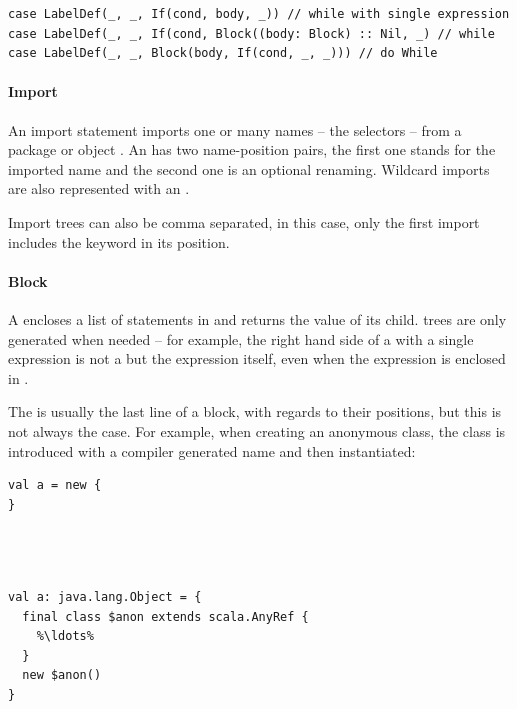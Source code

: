 \begin{lstlisting}
case LabelDef(_, _, If(cond, body, _)) // while with single expression
case LabelDef(_, _, If(cond, Block((body: Block) :: Nil, _) // while
case LabelDef(_, _, Block(body, If(cond, _, _))) // do While
\end{lstlisting}

\paragraph{Import} 

\noindent An import statement imports one or many names -- the selectors -- from a package or object . An  has two name-position pairs, the first one stands for the imported name and the second one is an optional renaming. Wildcard imports are also represented with an .

Import trees can also be comma separated, in this case, only the first import includes the  keyword in its position.

\paragraph{Block} 

\noindent A  encloses a list of statements in \src{\{ \ldots \}} and returns the value of its  child.  trees are only generated when needed -- for example, the right hand side of a  with a single expression is not a  but the expression itself, even when the expression is enclosed in \src{\{ \ldots \}}.

The  is usually the last line of a block, with regards to their positions, but this is not always the case. For example, when creating an anonymous class, the class is introduced with a compiler generated name and then instantiated:

\begin{multicols}{2}
\begin{lstlisting}
val a = new {
}




\end{lstlisting}
\begin{lstlisting}
val a: java.lang.Object = {
  final class $anon extends scala.AnyRef {
    %\ldots%
  }
  new $anon()
}
\end{lstlisting}
\end{multicols}

